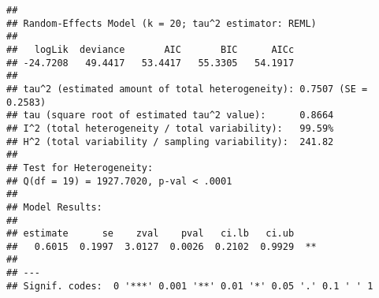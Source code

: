 \documentclass[]{book}
\newenvironment{Shaded}{\begin{snugshade}}{\end{snugshade}}
\newcommand{\CommentTok}[1]{\textcolor[rgb]{0.56,0.35,0.01}{\textit{#1}}}
\newcommand{\DataTypeTok}[1]{\textcolor[rgb]{0.13,0.29,0.53}{#1}}
\newcommand{\FloatTok}[1]{\textcolor[rgb]{0.00,0.00,0.81}{#1}}
\newcommand{\KeywordTok}[1]{\textcolor[rgb]{0.13,0.29,0.53}{\textbf{#1}}}
\newcommand{\NormalTok}[1]{#1}
\newcommand{\OperatorTok}[1]{\textcolor[rgb]{0.81,0.36,0.00}{\textbf{#1}}}
\newcommand{\StringTok}[1]{\textcolor[rgb]{0.31,0.60,0.02}{#1}}
\theoremstyle{definition}
\theoremstyle{definition}
\theoremstyle{definition}
\theoremstyle{remark}
\begin{document}
\begin{Shaded}
\end{Shaded}

\begin{verbatim}
## 
## Random-Effects Model (k = 20; tau^2 estimator: REML)
## 
##   logLik  deviance       AIC       BIC      AICc 
## -24.7208   49.4417   53.4417   55.3305   54.1917   
## 
## tau^2 (estimated amount of total heterogeneity): 0.7507 (SE = 0.2583)
## tau (square root of estimated tau^2 value):      0.8664
## I^2 (total heterogeneity / total variability):   99.59%
## H^2 (total variability / sampling variability):  241.82
## 
## Test for Heterogeneity:
## Q(df = 19) = 1927.7020, p-val < .0001
## 
## Model Results:
## 
## estimate      se    zval    pval   ci.lb   ci.ub 
##   0.6015  0.1997  3.0127  0.0026  0.2102  0.9929  ** 
## 
## ---
## Signif. codes:  0 '***' 0.001 '**' 0.01 '*' 0.05 '.' 0.1 ' ' 1
\end{verbatim}
\end{document}
